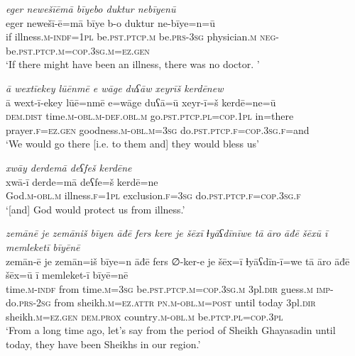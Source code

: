 \ea \label{DG.5}
\textit{eger newešīēmā bīyebo duktur nebīyenū} \\ 
\gll eger newešī-ē=mā bīye b-o duktur ne-bīye=n=ū \\ 
 if illness\textsc{.m}\textsc{-indf}\textsc{=1pl} be\textsc{.pst}\textsc{.ptcp}\textsc{.m} be\textsc{.prs}\textsc{-3sg} physician\textsc{.m} \textsc{neg-}be\textsc{.pst}\textsc{.ptcp}\textsc{.m}\textsc{=cop}\textsc{.3sg}\textsc{.m}\textsc{=ez}\textsc{.gen} \\ 
\glt `If there might have been an illness, there was no doctor. '
\z 
 
\ea \label{DG.6}
\textit{ā wextīekey lūēnmē e wāge duʕāw xeyrīš kerdēnew} \\ 
\gll ā wext-ī-ekey lūē=nmē e=wāge duʕā=ū xeyr-ī=š kerdē=ne=ū \\ 
 \textsc{dem.dist} time\textsc{.m}\textsc{-obl}\textsc{.m}\textsc{-def}\textsc{.obl}\textsc{.m} go\textsc{.pst}\textsc{.ptcp}\textsc{.pl}\textsc{=cop}\textsc{.1pl} in=there prayer\textsc{\textsc{.f}}\textsc{=ez}\textsc{.gen} goodness\textsc{.m}\textsc{-obl}\textsc{.m}\textsc{=3sg} do\textsc{.pst}\textsc{.ptcp}\textsc{\textsc{.f}}\textsc{=cop}\textsc{.3sg}\textsc{\textsc{.f}}=and \\ 
\glt `We would go there [i.e. to them and] they would bless us'
\z 
 
\ea \label{DG.7}
\textit{xwāy derdemā deʕfeš kerdēne} \\ 
\gll xwā-ī derde=mā deʕfe=š kerdē=ne \\ 
 God\textsc{.m}\textsc{-obl}\textsc{.m} illness\textsc{\textsc{.f}}\textsc{=1pl} exclusion\textsc{\textsc{.f}}\textsc{=3sg} do\textsc{.pst}\textsc{.ptcp}\textsc{\textsc{.f}}\textsc{=cop}\textsc{.3sg}\textsc{\textsc{.f}} \\ 
\glt `[and] God would protect us from illness.'
\z 
 
\ea \label{DG.8}
\textit{zemānē je zemāniš bīyen āđē fers kere je šēxī ɫyāʕdīnīwe tā āro āđē šēxū ī memleketī bīyēnē} \\ 
\gll zemān-ē je zemān=iš bīye=n āđē fers ∅-ker-e je šēx=ī ɫyāʕdīn-ī=we tā āro āđē šēx=ū ī memleket-ī bīyē=nē \\ 
 time\textsc{.m}\textsc{-indf} from time\textsc{.m}\textsc{=3sg} be\textsc{.pst}\textsc{.ptcp}\textsc{.m}\textsc{=cop}\textsc{.3sg}\textsc{.m} 3pl\textsc{.dir} guess\textsc{.m} \textsc{imp-}do\textsc{.prs}-\textsc{2sg} from sheikh\textsc{.m}\textsc{=ez}.\textsc{attr} \textsc{pn}\textsc{.m}\textsc{-obl}\textsc{.m}\textsc{=\textsc{post}} until today 3pl\textsc{.dir} sheikh\textsc{.m}\textsc{=ez}\textsc{.gen} \textsc{dem.prox} country\textsc{.m}\textsc{-obl}\textsc{.m} be\textsc{.ptcp}\textsc{.pl}\textsc{=cop}\textsc{.3pl} \\ 
\glt `From a long time ago, let’s say from the period of Sheikh Ghayasadin until today, they have been Sheikhs in our region.'
\z 
 
